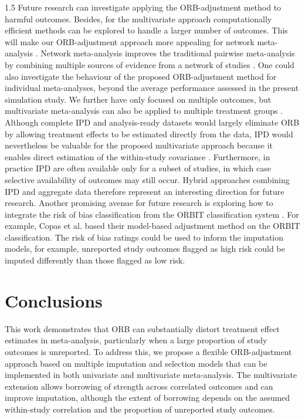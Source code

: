 \documentclass{article}
\begin{document}
\begin{spacing}{1.5}
Future research can investigate applying the ORB-adjustment method to harmful outcomes. Besides, for the multivariate approach computationally efficient methods can be explored to handle a larger number of outcomes. This will make our ORB-adjustment approach more appealing for network meta-analysis \cite{mavridis2014selection}. Network meta-analysis improves the traditional pairwise meta-analysis by combining multiple sources of evidence from a network of studies \cite{mills2013demystifying}. One could also investigate the behaviour of the proposed ORB-adjustment method for individual meta-analyses, beyond the average performance assessed in the present simulation study.
We further have only focused on multiple outcomes, but multivariate meta-analysis can also be applied to multiple treatment groups \cite{hasselblad1998meta}. 
Although complete IPD and analysis-ready datasets would largely eliminate ORB by allowing treatment effects to be estimated directly from the data, IPD would nevertheless be valuable for the proposed multivariate approach because it enables direct estimation of the within-study covariance \cite{jackson2011multivariate, kirkham2012multivariate, mavridis2013practical}. Furthermore, in practice IPD are often available only for a subset of studies, in which case selective availability of outcomes may still occur. Hybrid approaches combining IPD and aggregate data therefore represent an interesting direction for future research.
Another promising avenue for future research is exploring how to integrate the risk of bias classification from the ORBIT classification system \cite{kirkham2010impact}. For example, Copas et al. \cite{copas2014model} based their model-based adjustment method on the ORBIT classification. The risk of bias ratings could be used to inform the imputation models, for example, unreported study outcomes flagged as high risk could be imputed differently than those flagged as low risk. 

\section{Conclusions}
\label{conclusion}
This work demonstrates that ORB can substantially distort treatment effect estimates in meta-analysis, particularly when a large proportion of study outcomes is unreported. To address this, we propose a flexible ORB-adjustment approach based on multiple imputation and selection models that can be implemented in both univariate and multivariate meta-analysis. The multivariate extension allows borrowing of strength across correlated outcomes and can improve imputation, although the extent of borrowing depends on the assumed within-study correlation and the proportion of unreported study outcomes.


\end{spacing}
\end{document}

